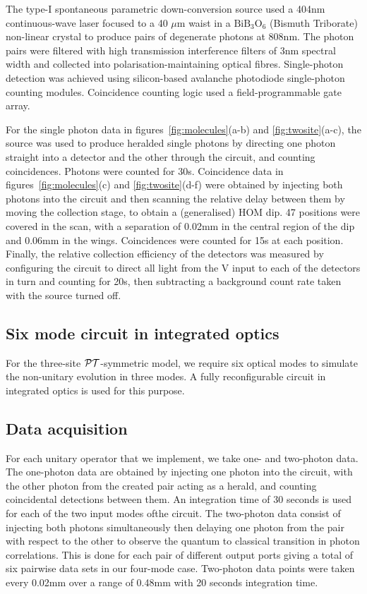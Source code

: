 The type-I spontaneous parametric down-conversion source used a 404nm
continuous-wave laser focused to a 40 \(\mu\)m waist in a \(\text{BiB}_3
\text{O}_6\) (Bismuth Triborate) non-linear crystal to produce pairs of
degenerate photons at 808nm. The photon pairs were filtered with high
transmission interference filters of 3nm spectral width and collected into
polarisation-maintaining optical fibres. Single-photon detection was achieved
using silicon-based avalanche photodiode single-photon counting modules.
Coincidence counting logic used a field-programmable gate array.

For the single photon data in figures~\ref{fig:molecules}(a-b) and
\ref{fig:twosite}(a-c), the source was used to produce heralded single photons
by directing one photon straight into a detector and the other through the
circuit, and counting coincidences. Photons were counted for 30s. Coincidence
data in figures~\ref{fig:molecules}(c) and \ref{fig:twosite}(d-f) were obtained
by injecting both photons into the circuit and then scanning the relative delay
between them by moving the collection stage, to obtain a (generalised) HOM dip.
47 positions were covered in the scan, with a separation of 0.02mm in the
central region of the dip and 0.06mm in the wings. Coincidences were counted for
15s at each position. Finally, the relative collection efficiency of the
detectors was measured by configuring the circuit to direct all light from the
V input to each of the detectors in turn and counting for 20s, then subtracting
a background count rate taken with the source turned off.

\subsection{Six mode circuit in integrated optics}
For the three-site \(\mathcal{PT}\)-symmetric model, we require six optical modes to
simulate the non-unitary evolution in three modes. A fully reconfigurable
circuit in integrated optics is used for this purpose.

\subsection{Data acquisition}
For each unitary operator that we implement, we take one- and two-photon data.
The one-photon data are obtained by injecting one photon into the circuit, with
the other photon from the created pair acting as a herald, and counting
coincidental detections between them. An integration time of 30 seconds is used
for each of the two input modes ofthe circuit.
The two-photon data consist of injecting both photons simultaneously then
delaying one photon from the pair with respect to the other to observe the
quantum to classical transition in photon correlations. This is done for each
pair of different output ports giving a total of six pairwise data sets in our
four-mode case. Two-photon data points were taken every 0.02mm over a range of
0.48mm with 20 seconds integration time.

